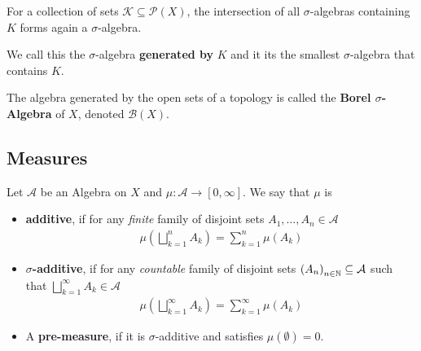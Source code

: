 \begin{dfn}[]
  For a collection of sets $\mathcal{K} \subseteq \mathcal{P}(X)$, the intersection of all $\sigma$-algebras containing $K$ forms again a $\sigma$-algebra.

  We call this the $\sigma$-algebra \textbf{generated by} $K$ and it its the smallest $\sigma$-algebra that contains $K$.

  The algebra generated by the open sets of a topology is called the \textbf{Borel $\sigma$-Algebra} of $X$, denoted $\mathcal{B}(X)$.
\end{dfn}



\subsection{Measures}
\begin{dfn}[]
  Let $\mathcal{A}$ be an Algebra on $X$ and $\mu: \mathcal{A} \to [0,\infty]$. We say that $\mu$ is
  \begin{itemize}
    \item \textbf{additive}, if for any \emph{finite} family of disjoint sets $A_{1}, \ldots, A_{n} \in \mathcal{A}$
      \begin{align*}
        \mu \left(
          \bigsqcup_{k=1}^{n}A_k
        \right)
        =
        \sum_{k=1}^{n}\mu(A_k)
      \end{align*}
    \item \textbf{$\sigma$-additive}, if for any \emph{countable} family of
      disjoint sets $\left(A_{n}\right)_{n \in \mathbb{N}} \subseteq \mathcal{A}$ such that $\bigsqcup_{k=1}^{\infty}A_k \in \mathcal{A}$
      \begin{align*}
        \mu \left(
          \bigsqcup_{k=1}^{\infty}A_k
        \right)
        =
        \sum_{k=1}^{\infty}\mu(A_k)
      \end{align*}
    \item A \textbf{pre-measure}, if it is $\sigma$-additive and satisfies $\mu(\emptyset) = 0$.
  \end{itemize}
\end{dfn}

